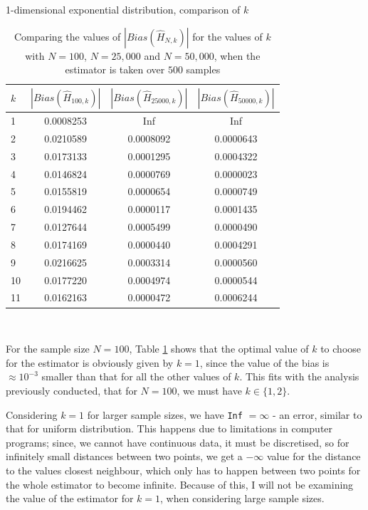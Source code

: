 \documentclass[12pt]{report}
\begin{document}
\begin{table}
\caption{1-dimensional exponential distribution, comparison of $k$} \label{expo_kcompare_table}
\begin{center}
\begin{tabular}{| l | c c c |} 
\toprule
$k$ &  $|Bias(\hat{H}_{100, k})|$ & $|Bias(\hat{H}_{25000, k})|$  &  $|Bias(\hat{H}_{50000, k})|$ \\
\midrule[1pt]
1     & 0.0008253    &       Inf    &       Inf   \\
2     & 0.0210589    & 0.0008092    & 0.0000643   \\
3     & 0.0173133    & 0.0001295    & 0.0004322   \\
4     & 0.0146824    & 0.0000769    & 0.0000023   \\
5     & 0.0155819    & 0.0000654    & 0.0000749   \\
6     & 0.0194462    & 0.0000117    & 0.0001435   \\
7     & 0.0127644    & 0.0005499    & 0.0000490   \\
8     & 0.0174169    & 0.0000440    & 0.0004291   \\
9     & 0.0216625    & 0.0003314    & 0.0000560   \\
10    & 0.0177220    & 0.0004974    & 0.0000544   \\
11    & 0.0162163    & 0.0000472    & 0.0006244   \\
\hline
\end{tabular}
\\[10pt]
\caption*{Comparing the values of $|Bias(\hat{H}_{N, k})|$ for the values of $k$ with $N=100$, $N=25,000$ and $N=50,000$, when the estimator is taken over $500$ samples}
\end{center}
\end{table}

For the sample size $N=100$, Table \ref{expo_kcompare_table} shows that the optimal value of $k$ to choose for the estimator is obviously given by $k=1$, since the value of the bias is $\approx 10^{-3}$ smaller than that for all the other values of $k$. This fits with the analysis previously conducted, that for $N=100$, we must have $k \in \{1, 2\}$. 

Considering $k=1$ for larger sample sizes, we have \texttt{Inf} $= \infty$ - an error, similar to that for uniform distribution. This happens due to limitations in computer programs; since, we cannot have continuous data, it must be discretised, so for infinitely small distances between two points, we get a $-\infty$ value for the distance to the values closest neighbour, which only has to happen between two points for the whole estimator to become infinite. Because of this, I will not be examining the value of the estimator for $k=1$, when considering large sample sizes.
\end{document}
